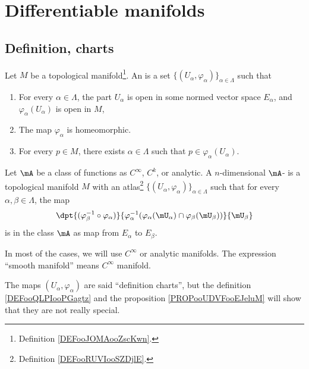 

\section{Differentiable manifolds}

\subsection{Definition, charts}

\begin{definition}		\label{DEFooRUVIooSZDjlE}
	Let \( M\) be a topological manifold\footnote{Definition \ref{DEFooJOMAooZscKwn}.}. An  is a set \( \{ (U_{\alpha}, \varphi_{\alpha})\}_{\alpha\in\Lambda}\) such that
	\begin{enumerate}
		\item
		      For every \( \alpha\in\Lambda\), the part \( U_{\alpha}\) is open in some normed vector space \( E_{\alpha}\), and \( \varphi_{\alpha}(U_{\alpha})\) is open in \( M\),
		\item
		      The map \( \varphi_{\alpha}\) is homeomorphic.
		\item
		      For every \( p\in M\), there exists \( \alpha\in \Lambda\) such that \( p\in \varphi_{\alpha}(U_{\alpha})\).
	\end{enumerate}
\end{definition}

\begin{definition}		\label{DEFooVMWRooGQYJwl}
	Let \( \mA\) be a class of functions as \(  C^{\infty}\), \( C^k\), or analytic. A $n$-dimensional \( \mA\)- is a topological manifold \( M\) with an atlas\footnote{Definition \ref{DEFooRUVIooSZDjlE}.} \( \{ (U_{\alpha}, \varphi_{\alpha}) \}_{\alpha\in\Lambda}\) such that for every \( \alpha,\beta\in\Lambda\), the map
	\begin{equation}
		\dpt{  (\varphi_{\beta}^{-1}\circ\varphi_{\alpha})  }{   \varphi_{\alpha}^{-1}( \varphi_{\alpha}(\mU_{\alpha})\cap\varphi_{\beta}(\mU_{\beta})  )   }{\mU_{\beta}}
	\end{equation}
	is in the class \( \mA\) as map from \( E_{\alpha}\) to \( E_{\beta}\).

	In most of the cases, we will use \(  C^{\infty}\) or analytic manifolds. The expression ``smooth manifold'' means \(  C^{\infty}\) manifold.

	The maps \( (U_{\alpha}, \varphi_{\alpha})\) are said ``definition charts'', but the definition \ref{DEFooQLPIooPGagtz} and the proposition \ref{PROPooUDVFooEJeluM} will show that they are not really special.
\end{definition}


